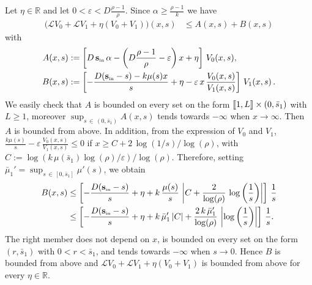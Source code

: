 \documentclass[AHL,Unicode,longabstracts,published]{cedram}
\newcommand{\llbracket}{\mathopen{[\mkern -2.7mu[}}
\newcommand{\rrbracket}{\mathclose{]\mkern -2.7mu]}}
\newcommand{\RR}{\mathbb{R}}
\newcommand{\clL}{\mathcal{L}}
\newcommand{\Sin}{{\mathbf s}_{\textrm{\tiny\rm in}}}
\newcommand{\1}{\mathbf{1}}
\begin{document}
Let $\eta \in \RR$ and let $0<\varepsilon< D\frac{\rho-1}{\rho}$. Since $\alpha\geq \frac{\rho-1}{k}$ we have
\begin{align*}
\big(\clL V_0 + \clL V_1 + \eta (V_0+V_1)\big)(x,s) & \leq A(x, s)+B(x, s)
\end{align*}
with
\begin{align*}
A(x, s)&:=\left[D\,\Sin\, \alpha - \left(D\frac{\rho-1}{\rho}-\varepsilon\right) x + \eta\right]\,V_0(x,s),\\
B(x,s)&:=\left[-\frac{D(\Sin - s)- k \mu(s) x }{s}+ \eta-\varepsilon\,x\,\frac{V_0(x,s)}{V_1(x,s)}\right]\,V_1(x,s)\,.
\end{align*}
We easily check that $A$ is bounded on every set on the form $\llbracket 1,L\rrbracket \times (0,\bar s_1)$ with $L\geq 1$, moreover $\sup_{s\,\in\,(0,\bar s_1)}A(x, s)$ tends towards $-\infty$ when $x \to \infty$. Then $A$ is bounded from above. In addition, from the expression of $V_0$ and $V_1$, $\frac{k \mu(s)}{s}-\varepsilon\,\frac{V_0(x,s)}{V_1(x,s)}\leq 0$ if $x \geq C+2\,\log(1/s)/\log(\rho)$, with $C:=\log(k\,\mu(\bar s_1)\log(\rho)/\varepsilon)/\log(\rho)$. Therefore, setting $\bar \mu_1' = \sup_{s\,\in\,[0,\bar s_1]}\mu'(s)$, we obtain
\begin{align*}
B(x,s)&\leq \left[-\frac{D(\Sin - s)}{s}+ \eta+k \,\frac{\mu(s)}{s}\,\left|C+\frac{2}{\log(\rho)}\,\log\left(\frac{1}{s}\right)\right| \right]\,\frac{1}{s}\\
&\leq \left[-\frac{D(\Sin - s)}{s}+ \eta+k \,\bar \mu_1'\,|C|+\frac{2\,k \,\bar \mu_1'}{\log(\rho)}\,\left|\log\left(\frac{1}{s}\right)\right| \right]\,\frac{1}{s}.
\end{align*}
The right member does not depend on $x$, is bounded on every set on the form $(r,\bar s_1)$ with $0<r<\bar s_1$, and tends towards $-\infty$ when $s\to 0$. Hence $B$ is bounded from above and $\clL V_0 + \clL V_1 + \eta (V_0+V_1)$ is bounded from above for every $\eta\in \RR$.
\end{document}
